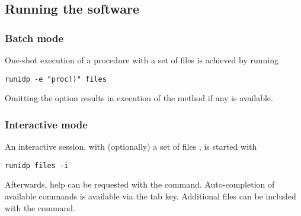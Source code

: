 \subsection{Running the software}
\subsubsection{Batch mode}
One-shot execution of a procedure  with a set of files  is achieved by running
\begin{lstlisting}
runidp -e "proc()" files
\end{lstlisting}
Omitting the  option results in execution of the  method if any is available.

\subsubsection{Interactive mode}
An interactive session, with (optionally) a set of files , is started with 
\begin{lstlisting}
runidp files -i
\end{lstlisting}

Afterwards, help can be requested with the  command. 
Auto-completion of available commands is available via the tab key.
Additional files can be included with the  command.
